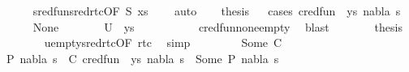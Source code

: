 \begin{isabellebody}
\ \ \ \ \isamarkupfalse%
\ sred{\isacharunderscore}{\kern0pt}fun{\isacharunderscore}{\kern0pt}sred{\isacharunderscore}{\kern0pt}rtc{\isacharbrackleft}{\kern0pt}OF\ S{\isacharbrackright}{\kern0pt}\ {\isacartoucheopen}xs\ {\isacharequal}{\kern0pt}\ {\isacharbrackleft}{\kern0pt}{\isacharbrackright}{\kern0pt}{\isacartoucheclose}\ \isamarkupfalse%
\ auto\isanewline
\ \ \isamarkupfalse%
\ {\isacharquery}{\kern0pt}thesis\isanewline
\ \ \isamarkupfalse%
{\isacharparenleft}{\kern0pt}cases\ {\isachardoublequoteopen}cred{\isacharunderscore}{\kern0pt}fun\ {\isacharparenleft}{\kern0pt}{\isacharparenleft}{\kern0pt}{\isacharbrackleft}{\kern0pt}{\isacharbrackright}{\kern0pt}{\isacharcomma}{\kern0pt}\ ys{\isacharparenright}{\kern0pt}{\isacharcomma}{\kern0pt}\ nabla{}{\isacharcomma}{\kern0pt}\ s{}{\isacharparenright}{\kern0pt}{\isachardoublequoteclose}{\isacharparenright}{\kern0pt}\isanewline
\ \ \ \ \isamarkupfalse%
\ None\isanewline
\ \ \ \ \isamarkupfalse%
\ \isamarkupfalse%
\ {\isachardoublequoteopen}U\ {\isacharparenleft}{\kern0pt}{\isacharbrackleft}{\kern0pt}{\isacharbrackright}{\kern0pt}{\isacharcomma}{\kern0pt}\ ys{\isacharparenright}{\kern0pt}\ {\isacharequal}{\kern0pt}\ {\isacharbraceleft}{\kern0pt}{\isacharbraceright}{\kern0pt}{\isachardoublequoteclose}\ \isanewline
\ \ \ \ \ \ \isamarkupfalse%
\ cred{\isacharunderscore}{\kern0pt}fun{\isacharunderscore}{\kern0pt}none{\isacharunderscore}{\kern0pt}empty\ \isamarkupfalse%
\ blast\isanewline
\ \ \ \ \isamarkupfalse%
\ \isamarkupfalse%
\ {\isacharquery}{\kern0pt}thesis\ \isanewline
\ \ \ \ \ \ \isamarkupfalse%
\ u{\isacharunderscore}{\kern0pt}empty{\isacharunderscore}{\kern0pt}sred{\isacharunderscore}{\kern0pt}rtc{\isacharbrackleft}{\kern0pt}OF\ rtc{\isacharbrackright}{\kern0pt}\ \isamarkupfalse%
\ simp\isanewline
\ \ \isamarkupfalse%
\isanewline
\ \ \ \ \isamarkupfalse%
\ {\isacharparenleft}{\kern0pt}Some\ C{\isacharparenright}{\kern0pt}\isanewline
\ \ \ \ \isamarkupfalse%
\ \isamarkupfalse%
\ P{}\ nabla{}\ s{}{\isacharprime}{\kern0pt}\ \ C{\isacharcolon}{\kern0pt}\ {\isachardoublequoteopen}cred{\isacharunderscore}{\kern0pt}fun\ {\isacharparenleft}{\kern0pt}{\isacharparenleft}{\kern0pt}{\isacharbrackleft}{\kern0pt}{\isacharbrackright}{\kern0pt}{\isacharcomma}{\kern0pt}\ ys{\isacharparenright}{\kern0pt}{\isacharcomma}{\kern0pt}\ nabla{}{\isacharcomma}{\kern0pt}\ s{}{\isacharparenright}{\kern0pt}\ {\isacharequal}{\kern0pt}\ Some\ {\isacharparenleft}{\kern0pt}P{}{\isacharcomma}{\kern0pt}\ nabla{}{\isacharcomma}{\kern0pt}\ s{}{\isacharprime}{\kern0pt}{\isacharparenright}{\kern0pt}{\isachardoublequoteclose}\isanewline

\end{isabellebody}
